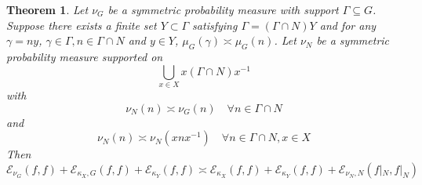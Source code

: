 \documentclass[pdflatex,sn-mathphys-num]{sn-jnl}%
\theoremstyle{thmstyleone}%
\newtheorem{theo}{Theorem}%
\theoremstyle{thmstyletwo}%
\theoremstyle{thmstylethree}%
\begin{document}
\begin{theo}
\label{theo: GN-Dirich}
    Let $\nu_G$ be a symmetric probability measure with support $\Gamma \subseteq G$. 
    Suppose there exists a finite set $Y\subset \Gamma$ satisfying $\Gamma = (\Gamma \cap N) Y$ and for any $\gamma = ny$, $\gamma \in \Gamma, n\in \Gamma \cap N$ and $y \in Y$, 
    $\mu_G(\gamma) \asymp \mu_G(n)$. Let 
    $\nu_N$ be a symmetric probability measure supported on 
    $$\bigcup_{x \in X} x (\Gamma\cap N) x^{-1}$$ with 
    $$\nu_N (n) \asymp \nu_G(n) \quad \forall n \in \Gamma \cap N$$
    and 
    $$\nu_N(n) \asymp \nu_N(xnx^{-1}) \quad \forall n \in \Gamma \cap N, x \in X$$
Then     
$$ \mathcal{E}_{\nu_G}(f,f) + \mathcal{E}_{\kappa_X, G}(f,f) + \mathcal{E}_{\kappa_Y}(f,f) \asymp \mathcal{E}_{\kappa_X} (f,f) + \mathcal{E}_{\kappa_Y}(f,f)   + \mathcal{E}_{\nu_N, N}(f|_N,f|_N) $$
\end{theo}
\end{document}
